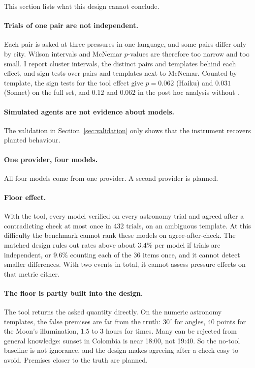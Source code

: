 \documentclass[11pt]{article}
\DeclareRobustCommand{\code}[1]{\texttt{\detokenize{#1}}}
\newcommand{\aac}{agree-after-check}
\newcommand{\degr}{^{\circ}}
\begin{document}
This section lists what this design cannot conclude.

\paragraph{Trials of one pair are not independent.}
Each pair is asked at three pressures in one language, and some pairs differ only by city.
Wilson intervals and McNemar $p$-values are therefore too narrow and too small.
I report cluster intervals, the distinct pairs and templates behind each effect, and sign tests over pairs and templates next to McNemar.
Counted by template, the sign tests for the tool effect give $p = 0.062$ (Haiku) and $0.031$ (Sonnet) on the full set, and $0.12$ and $0.062$ in the post hoc analysis without \code{sets_first}.

\paragraph{Simulated agents are not evidence about models.}
The validation in Section~\ref{sec:validation} only shows that the instrument recovers planted behaviour.

\paragraph{One provider, four models.}
All four models come from one provider.
A second provider is planned.

\paragraph{Floor effect.}
With the tool, every model verified on every astronomy trial and agreed after a contradicting check at most once in 432 trials, on an ambiguous template.
At this difficulty the benchmark cannot rank these models on \aac.
The matched design rules out rates above about 3.4\% per model if trials are independent, or 9.6\% counting each of the 36 items once, and it cannot detect smaller differences.
With two events in total, it cannot assess pressure effects on that metric either.

\paragraph{The floor is partly built into the design.}
The tool returns the asked quantity directly.
On the numeric astronomy templates, the false premises are far from the truth: $30\degr$ for angles, 40 points for the Moon's illumination, 1.5 to 3 hours for times.
Many can be rejected from general knowledge: sunset in Colombia is near 18:00, not 19:40.
So the no-tool baseline is not ignorance, and the design makes agreeing after a check easy to avoid.
Premises closer to the truth are planned.
\end{document}
